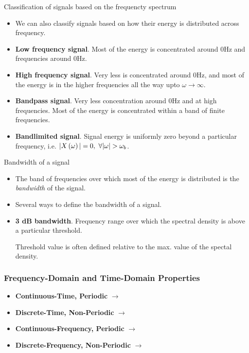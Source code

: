 \documentclass[aspectratio=169]{beamer}
\let\olditem\item
\renewcommand{\item}{\setlength{\itemsep}{\fill}\olditem}
\def\lp{\ensuremath\left(}
\def\rp{\ensuremath\right)}
\begin{document}
\begin{frame}[t]{Classification of signals based on the frequencty spectrum}
\begin{itemize}
  \item We can also classify signals based on how their energy is distributed across frequency.
  \item \textbf{Low frequency signal}. Most of the energy is concentrated around 0Hz and frequencies around 0Hz.
  \item \textbf{High frequency signal}. Very less is concentrated around 0Hz, and most of the energy is in the higher frequencies all the way upto $\omega \to \infty$.
  \item \textbf{Bandpass signal}. Very less concentration around 0Hz and at high frequencies. Most of the energy is concentrated within a band of finite frequencies. 
  \item \textbf{Bandlimited signal}. Signal energy is uniformly zero beyond a particular frequency, i.e. $\vert X\lp \omega \rp \vert = 0, \,\, \forall \vert \omega \vert > \omega_b$.
\end{itemize}
\end{frame}


\begin{frame}[t]{Bandwidth of a signal}
\begin{itemize}
  \item The band of frequencies over which most of the energy is distributed is the \textit{bandwidth} of the signal.
  \item Several ways to define the bandwidth of a signal.
  \item \textbf{3 dB bandwidth}. Frequency range over which the spectral density is above a particular threshold.

  Threshold value is often defined relative to the max. value of the spectal density.
\end{itemize}
\end{frame}


\begin{frame}[t]
  \frametitle{Frequency-Domain and Time-Domain Properties}
  \begin{itemize}
    \item \textbf{Continuous-Time, Periodic} $\longrightarrow$
    \item \textbf{Discrete-Time, Non-Periodic} $\longrightarrow$
    \item \textbf{Continuous-Frequency, Periodic} $\longrightarrow$
    \item \textbf{Discrete-Frequency, Non-Periodic} $\longrightarrow$
  \end{itemize}
\end{frame}
\end{document}
